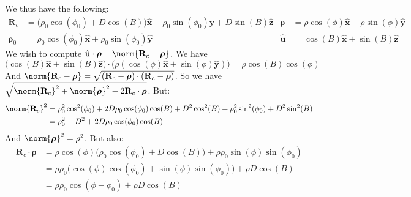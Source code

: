 \documentclass[crop=false,class=article,oneside]{standalone}
\begin{document}
            We thus have the following:
            \begin{align*}
                \mathbf{R}_{c}
                &=\big(
                    \rho_{0}\cos(\phi_0)+D\cos(B)
                \big)\hat{\mathbf{x}}+
                \rho_{0}\sin(\phi_{0})\hat{\mathbf{y}}+
                D\sin(B)\hat{\mathbf{z}}
                &
                \boldsymbol{\rho}
                &=\rho\cos(\phi)\hat{\mathbf{x}}+
                \rho\sin(\phi)\hat{\mathbf{y}}\\
                \boldsymbol{\rho}_{0}
                &=\rho_{0}\cos(\phi_0)\hat{\mathbf{x}}+
                \rho_{0}\sin(\phi_{0})\hat{\mathbf{y}}
                &
                \hat{\mathbf{u}}
                &=\cos(B)\hat{\mathbf{x}}+\sin(B)\hat{\mathbf{z}}
            \end{align*}
            We wish to compute
            $\hat{\mathbf{u}}\cdot%
             \boldsymbol{\rho}+%
             \norm{\mathbf{R}_{c}-\boldsymbol{\rho}}$.
             We have
            \begin{equation*}
                \big(
                    \cos(B)\hat{\mathbf{x}}+\sin(B)\hat{\mathbf{z}}
                \big)\cdot\big(
                    \rho(\cos(\phi)\hat{\mathbf{x}}+
                    \sin(\phi)\hat{\mathbf{y}})
                \big)=\rho\cos(B)\cos(\phi)
            \end{equation*}
            And
            $\norm{\mathbf{R}_{c}-\boldsymbol{\rho}}%
             =\sqrt{(\mathbf{R}_{c}-%
                    \boldsymbol{\rho})\cdot(\mathbf{R}_{c}-%
                    \boldsymbol{\rho})}$.
            So we have
            $\sqrt{\norm{\mathbf{R}_{c}}^2+%
             \norm{\boldsymbol{\rho}}^2-%
             2\mathbf{R}_{c}\cdot\boldsymbol{\rho}}$.
            But:
            \begin{align*}
                \norm{\mathbf{R}_{c}}^{2}
                &=\rho_{0}^2\cos^2(\phi_0)+
                  2D\rho_{0}\cos(\phi_0)\cos(B)+D^2\cos^2(B)+
                  \rho_{0}^2\sin^2(\phi_0)+D^2\sin^2(B)\\
                &=\rho_{0}^2+D^2+2D\rho_{0}\cos(\phi_0)\cos(B)
            \end{align*}
            And $\norm{\boldsymbol{\rho}}^{2}=\rho^{2}$.
            But also:
            \begin{align*}
                \mathbf{R}_{c}\cdot\boldsymbol{\rho}
                &=\rho\cos(\phi)\big(
                      \rho_{0}\cos(\phi_{0})+D\cos(B)
                  \big)+\rho\rho_{0}\sin(\phi)\sin(\phi_{0})\\
                &=\rho\rho_{0}\big(
                      \cos(\phi)\cos(\phi_{0})+
                      \sin(\phi)\sin(\phi_{0})
                  \big)+\rho D\cos(B)\\
                &=\rho\rho_{0}\cos(\phi-\phi_{0})+\rho D\cos(B)
            \end{align*}
\end{document}
